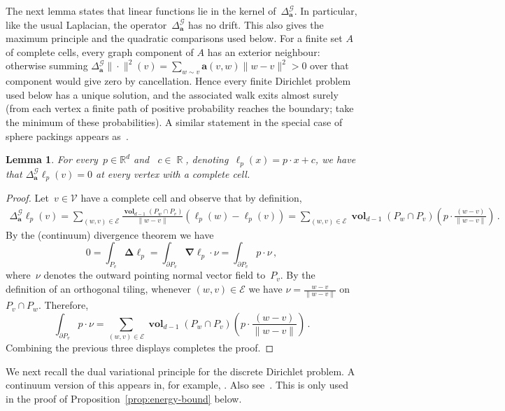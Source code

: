 \documentclass[12pt]{amsart}
\numberwithin{equation}{section}
\DeclareMathOperator{\R}{\mathbb{R}}
\newtheorem{lemma}[theorem]{Lemma}
\newcommand*{\Rd}{\ensuremath{\mathbb{R}^d}}
\newcommand{\V}{\mathcal{V}}
\newcommand{\E}{\mathcal{E}}
\newcommand{\CLap}{\boldsymbol{\Delta}}
\newcommand{\Cnabla}{\boldsymbol{\nabla}}
\newcommand{\aDelta}{\hyperref[eq:geometric-laplacian]{{\Delta^{\mathcal{G}}_{\cond}}}}
\newcommand{\cond}{\hyperref[eq:geometric-laplacian]{\mathbf{a}}}
\DeclareMathOperator{\vol}{\mathbf{vol}}
\begin{document}
The next lemma states that linear functions lie in the kernel of~$\aDelta$. In particular, like the usual Laplacian, the operator~$\aDelta$ has no drift.
This also gives the maximum principle and the quadratic comparisons used below. For a finite set $A$ of complete cells, every graph component of $A$ has an exterior neighbour: otherwise summing
     $\aDelta\|\cdot\|^2(v)=\sum_{w\sim v}\cond(v,w)\|w-v\|^2>0$
     over that component would give zero by cancellation. Hence every finite Dirichlet problem used below has a unique solution, and the associated walk exits almost surely (from each vertex a finite path of positive probability reaches the boundary; take the minimum of these probabilities).
A similar statement in the special case of sphere packings appears as~\cite[Proposition 6.4]{MR4425348}.
\begin{lemma} \label{lemma:linear-lie-in-kernel}
	For every~$p \in \Rd$ and ~$c \in \R$, denoting~$\ell_p(x) = p \cdot x + c$, 
we have that $\aDelta \ell_p(v) = 0$ at every vertex with a complete cell. 
\end{lemma}
\begin{proof}
	Let~$v \in \V$ have a complete cell and observe that by definition, 
	\begin{align*}
		\aDelta \ell_p(v) = \sum_{(w,v) \in \E} \frac{\vol_{d-1}(P_w \cap P_v)}{\|w - v\|} (\ell_p(w) - \ell_p(v))
		= 
				\sum_{(w,v) \in \E} \vol_{d-1}(P_w \cap P_v) \left( p \cdot \frac{(w-v)}{\|w - v\|} \right)\, . 
	\end{align*}
	By the (continuum) divergence theorem we have
	\[
	0 = \int_{P_v} \CLap \ell_p  = \int_{\partial P_v} \Cnabla \ell_p \cdot \nu
	= \int_{\partial P_v} p \cdot \nu 
	   \, , 
	\]
	where~$\nu$ denotes the outward pointing normal vector field to~$P_v$. By the definition of an orthogonal tiling, whenever $(w,v) \in \E$ we have $\nu = \frac{w-v}{\|w-v\|}$ on $P_v \cap P_w$. Therefore,
	\[
	\int_{\partial P_v} p \cdot \nu  = 	\sum_{(w,v) \in \E} \vol_{d-1}(P_w \cap P_v) \left( p \cdot \frac{(w-v)}{\|w - v\|} \right)\,.  
	\]
	Combining the previous three displays completes the proof. 
\end{proof}



We next recall the dual variational principle for the discrete Dirichlet problem. A continuum version of this appears in, for example, \cite[Section 8.7, Exercise 13]{evans2022partial}. Also see~\cite[Proposition 4.9]{gurel2020dirichlet}. This is only used in the proof of Proposition~\ref{prop:energy-bound} below.
 
\end{document}
